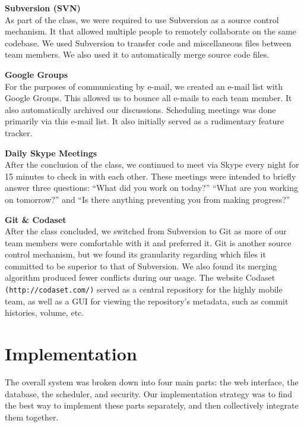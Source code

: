 \documentclass[12pt]{article}
\begin{document}
\begin{description}
\item{\textbf{Subversion (SVN)}} \\As part of the class, we were required to use Subversion as a source control mechanism. It that allowed multiple people to remotely collaborate on the same codebase. We used Subversion to transfer code and miscellaneous files between team members. We also used it to automatically merge source code files.
\item{\textbf{Google Groups}} \\For the purposes of communicating by e-mail, we created an e-mail list with Google Groups. This allowed us to bounce all e-mails to each team member. It also automatically archived our discussions. Scheduling meetings was done primarily via this e-mail list. It also initially served as a rudimentary feature tracker.
\item{\textbf{Daily Skype Meetings}} \\After the conclusion of the class, we continued to meet via Skype every night for 15 minutes to check in with each other. These meetings were intended to briefly answer three questions: ``What did you work on today?'' ``What are you working on tomorrow?'' and ``Is there anything preventing you from making progress?''
\item{\textbf{Git \& Codaset}} \\After the class concluded, we switched from Subversion to Git as more of our team members were comfortable with it and preferred it. Git is another source control mechanism, but we found its granularity regarding which files it committed to be superior to that of Subversion. We also found its merging algorithm produced fewer conflicts during our usage. The website Codaset \texttt{(http://codaset.com/)} served as a central repository for the highly mobile team, as well as a GUI for viewing the repository's metadata, such as commit histories, volume, etc.
\end{description}

\section{Implementation} %

The overall system was broken down into four main parts: the web interface, the database, the scheduler, and security. Our implementation strategy was to find the best way to implement these parts separately, and then collectively integrate them together.
\end{document}
